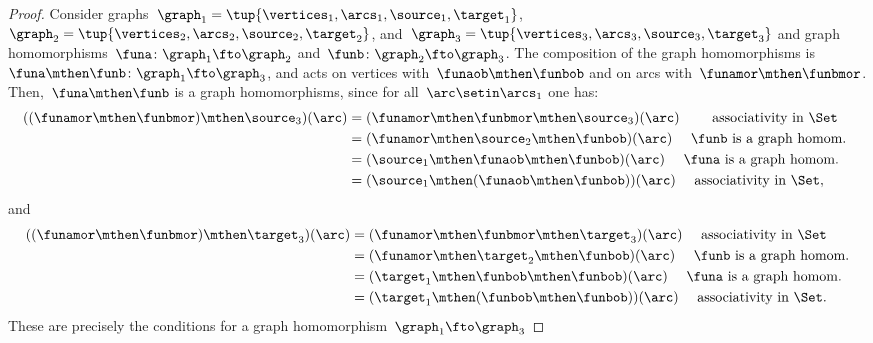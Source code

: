 \begin{proof}
    Consider graphs~$\graph_1=\tup{\vertices_1,\arcs_1,\source_1,\target_1}$,~$\graph_2=\tup{\vertices_2,\arcs_2,\source_2,\target_2}$, and~$\graph_3=\tup{\vertices_3,\arcs_3,\source_3,\target_3}$ and
    graph homomorphisms~$\funa \colon \graph_1 \fto \graph_2$ and~$\funb \colon \graph_2 \fto \graph_3$.
    The composition of the graph homomorphisms is~$\funa\mthen \funb \colon \graph_1 \fto \graph_3$, and acts on vertices with~$\funaob \mthen \funbob$ and on arcs with~$\funamor \mthen \funbmor$.
    Then,~$\funa\mthen \funb$ is a graph homomorphisms, since for all~$\arc \setin \arcs_1$ one has:
    \begin{equation*}
        \begin{aligned}
            ((\funamor\mthen \funbmor) \mthen \source_3)(\arc) & =(\funamor\mthen \funbmor \mthen \source_3)(\arc) \qquad \text{ associativity in \Set} \\
                                                               & =(\funamor\mthen \source_2 \mthen \funbob)(\arc) \quad \text{ $\funb$ is a graph homom.
            } \\
                                                               & =(\source_1 \mthen \funaob\mthen \funbob)(\arc) \quad \text{ $\funa$ is a graph homom.} \\
                                                               & =(\source_1 \mthen (\funaob\mthen \funbob))(\arc) \quad \text{ associativity in \Set},
        \end{aligned}
    \end{equation*}
    and
    \begin{equation*}
        \begin{aligned}
            ((\funamor \mthen \funbmor) \mthen \target_3)(\arc) & =(\funamor \mthen \funbmor \mthen \target_3)(\arc) \quad \text{ associativity in \Set} \\
                                                                & =(\funamor \mthen \target_2\mthen \funbob)(\arc) \quad \text{ $\funb$ is a graph homom.} \\
                                                                & =(\target_1 \mthen \funbob\mthen \funbob)(\arc)\quad \text{ $\funa$ is a graph homom.} \\
                                                                & =(\target_1 \mthen (\funbob\mthen \funbob))(\arc)\quad \text{ associativity in \Set}.
        \end{aligned}
    \end{equation*}
    These are precisely the conditions for a graph homomorphism~$\graph_1 \fto \graph_3$
\end{proof}
